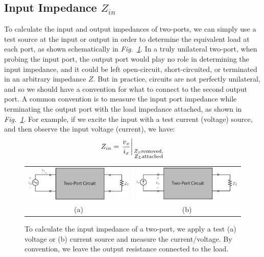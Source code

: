 \subsection{Input Impedance \texorpdfstring{$Z_{in}$}{}}
To calculate the input and output impedances of two-ports, we can simply use a test source at the input or output  in order to determine the equivalent load at each port, as shown schematically in \emph{Fig.~\ref{fig:2port_zin_vx}}.  In a truly unilateral two-port, when probing the input port, the output port would play no role in determining the input impedance, and it could be left open-circuit, short-circuited, or terminated in an arbitrary impedance $Z$.  But in practice, circuits are not perfectly unilateral, and so we should have a convention for what to connect to the second output port.
A common convention is to measure the input port impedance while terminating the output port with the load impedance attached, as shown in \emph{Fig.~\ref{fig:2port_zin_vx}}.  For example, if we excite the input with a test current (voltage) source, and then observe the input voltage (current), we have:
    \begin{equation}
        {Z_{in}} = {\left. \frac{v_x}{i_x}\right|_{\genfrac{}{}{0pt}{2}
            {\scriptstyle{Z_S}\text{removed},}
            {\scriptstyle{Z_L}\text{attached}}}}
    \end{equation}
\begin{figure}[tb]
\centering
\begin{tabular}{cc}
\includegraphics[width=.45\columnwidth]{2port_zin_vx} &
\includegraphics[width=.45\columnwidth]{2port_zin_ix}\\
(a) & (b)\\
\end{tabular}
\caption{To calculate the input impedance of a two-port, we apply a test (a) voltage or (b) current source and measure the current/voltage.  By convention, we leave the output resistance connected to the load.}
\label{fig:2port_zin_vx}
\end{figure}
